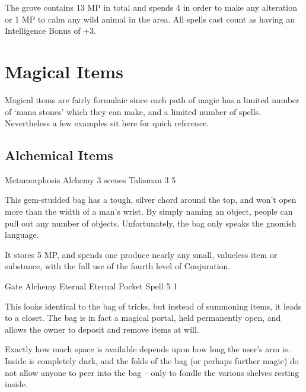 \begin{multicols}{2}

The grove contains 13 MP in total and spends 4 in order to make any alteration or 1 MP to calm any wild animal in the area.
All spells cast count as having an Intelligence Bonus of +3.

\end{multicols}

\section{Magical Items}
\label{magicalitems}

\begin{multicols}{2}

\noindent
Magical items are fairly formulaic since each path of magic has a limited number of `mana stones' which they can make, and a limited number of spells.
Nevertheless a few examples sit here for quick reference.

\subsection{Alchemical Items}

	{Metamorphosis}%
	{Alchemy}%
	{3 scenes}%
	{Talisman}%
	{3}%
	{5}%

This gem-studded bag has a tough, silver chord around the top, and won't open more than the width of a man's wrist.
By simply naming an object, people can pull out any number of objects.
Unfortunately, the bag only speaks the gnomish language.

It stores 5 MP, and spends one produce nearly any small, valueless item or substance, with the full use of the fourth level of Conjuration.

\label{bagOfHolding}
	{Gate}%
	{Alchemy}%
	{Eternal}%
	{Eternal Pocket Spell}%
	{5}%
	{1}%

This looks identical to the bag of tricks, but instead of summoning items, it leads to a closet.
The bag is in fact a magical portal, held permanently open, and allows the owner to deposit and remove items at will.

Exactly how much space is available depends upon how long the user's arm is.  Inside is completely dark, and the folds of the bag (or perhaps further magic) do not allow anyone to peer into the bag -- only to fondle the various shelves resting inside.


\end{multicols}
